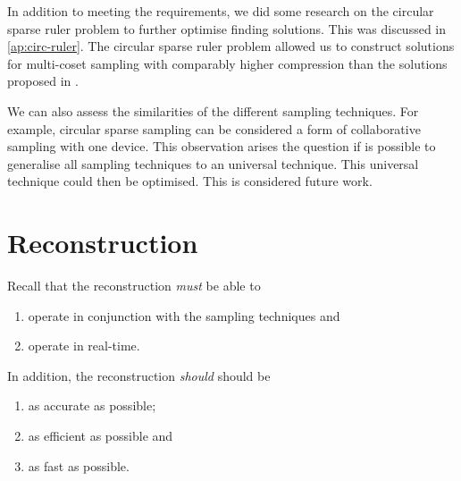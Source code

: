 \documentclass[a4paper, openany, oneside]{memoir}
\begin{document}
In addition to meeting the requirements, we did some research on the circular sparse ruler problem to further optimise finding solutions. This was discussed in \cref{ap:circ-ruler}. The circular sparse ruler problem allowed us to construct solutions for multi-coset sampling with comparably higher compression than the solutions proposed in \cite{ariananda2012compressive}.


We can also assess the similarities of the different sampling techniques. For example, circular sparse sampling can be considered a form of collaborative sampling with one device. This observation arises the question if is possible to generalise all sampling techniques to an universal technique. This universal technique could then be optimised. This is considered future work.  


\section{Reconstruction}
Recall that the reconstruction \textit{must} be able to
\begin{enumerate}
    \item operate in conjunction with the sampling techniques and
    \item operate in real-time.
\end{enumerate}
In addition, the reconstruction \textit{should} should be
\begin{enumerate}
    \item as accurate as possible;
    \item as efficient as possible and
    \item as fast as possible.
\end{enumerate}
\end{document}
